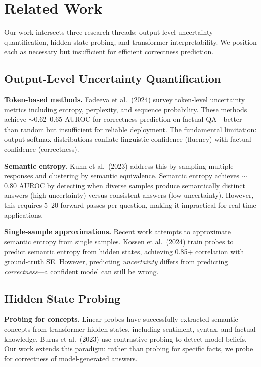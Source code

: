 \section{Related Work}

Our work intersects three research threads: output-level uncertainty quantification, hidden state probing, and transformer interpretability. We position each as necessary but insufficient for efficient correctness prediction.

\subsection{Output-Level Uncertainty Quantification}

\textbf{Token-based methods.} Fadeeva et al.\ (2024) survey token-level uncertainty metrics including entropy, perplexity, and sequence probability. These methods achieve $\sim$0.62--0.65 AUROC for correctness prediction on factual QA---better than random but insufficient for reliable deployment. The fundamental limitation: output softmax distributions conflate linguistic confidence (fluency) with factual confidence (correctness).

\textbf{Semantic entropy.} Kuhn et al.\ (2023) address this by sampling multiple responses and clustering by semantic equivalence. Semantic entropy achieves $\sim$0.80 AUROC by detecting when diverse samples produce semantically distinct answers (high uncertainty) versus consistent answers (low uncertainty). However, this requires 5--20 forward passes per question, making it impractical for real-time applications.

\textbf{Single-sample approximations.} Recent work attempts to approximate semantic entropy from single samples. Kossen et al.\ (2024) train probes to predict semantic entropy from hidden states, achieving 0.85+ correlation with ground-truth SE. However, predicting \emph{uncertainty} differs from predicting \emph{correctness}---a confident model can still be wrong.

\subsection{Hidden State Probing}

\textbf{Probing for concepts.} Linear probes have successfully extracted semantic concepts from transformer hidden states, including sentiment, syntax, and factual knowledge. Burns et al.\ (2023) use contrastive probing to detect model beliefs. Our work extends this paradigm: rather than probing for specific facts, we probe for correctness of model-generated answers.

